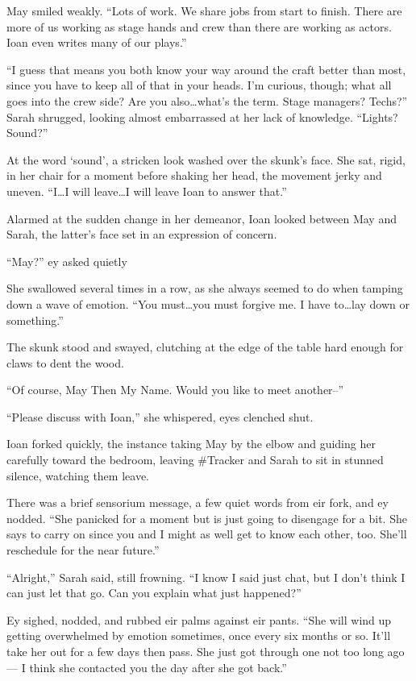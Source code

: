 May smiled weakly. ``Lots of work. We share jobs from start to finish. There are more of us working as stage hands and crew than there are working as actors. Ioan even writes many of our plays.''

``I guess that means you both know your way around the craft better than most, since you have to keep all of that in your heads. I'm curious, though; what all goes into the crew side? Are you also\ldots what's the term. Stage managers? Techs?'' Sarah shrugged, looking almost embarrassed at her lack of knowledge. ``Lights? Sound?''

At the word `sound', a stricken look washed over the skunk's face. She sat, rigid, in her chair for a moment before shaking her head, the movement jerky and uneven. ``I\ldots I will leave\ldots I will leave Ioan to answer that.''

Alarmed at the sudden change in her demeanor, Ioan looked between May and Sarah, the latter's face set in an expression of concern.

``May?'' ey asked quietly

She swallowed several times in a row, as she always seemed to do when tamping down a wave of emotion. ``You must\ldots you must forgive me. I have to\ldots lay down or something.''

The skunk stood and swayed, clutching at the edge of the table hard enough for claws to dent the wood.

``Of course, May Then My Name. Would you like to meet another--''

``Please discuss with Ioan,'' she whispered, eyes clenched shut.

Ioan forked quickly, the instance taking May by the elbow and guiding her carefully toward the bedroom, leaving \#Tracker and Sarah to sit in stunned silence, watching them leave.

There was a brief sensorium message, a few quiet words from eir fork, and ey nodded. ``She panicked for a moment but is just going to disengage for a bit. She says to carry on since you and I might as well get to know each other, too. She'll reschedule for the near future.''

``Alright,'' Sarah said, still frowning. ``I know I said just chat, but I don't think I can just let that go. Can you explain what just happened?''

Ey sighed, nodded, and rubbed eir palms against eir pants. ``She will wind up getting overwhelmed by emotion sometimes, once every six months or so. It'll take her out for a few days then pass. She just got through one not too long ago — I think she contacted you the day after she got back.''

